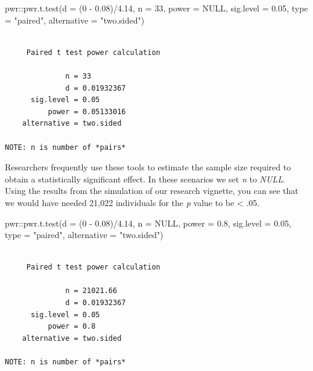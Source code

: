 \documentclass[
  11pt,
]{book}
\newenvironment{Shaded}{\begin{snugshade}}{\end{snugshade}}
\newcommand{\AttributeTok}[1]{\textcolor[rgb]{0.77,0.63,0.00}{#1}}
\newcommand{\ConstantTok}[1]{\textcolor[rgb]{0.00,0.00,0.00}{#1}}
\newcommand{\DecValTok}[1]{\textcolor[rgb]{0.00,0.00,0.81}{#1}}
\newcommand{\FloatTok}[1]{\textcolor[rgb]{0.00,0.00,0.81}{#1}}
\newcommand{\FunctionTok}[1]{\textcolor[rgb]{0.00,0.00,0.00}{#1}}
\newcommand{\NormalTok}[1]{#1}
\newcommand{\SpecialCharTok}[1]{\textcolor[rgb]{0.00,0.00,0.00}{#1}}
\newcommand{\StringTok}[1]{\textcolor[rgb]{0.31,0.60,0.02}{#1}}
\begin{document}
\begin{Shaded}
\begin{Highlighting}[]
\NormalTok{pwr}\SpecialCharTok{::}\FunctionTok{pwr.t.test}\NormalTok{(}\AttributeTok{d =}\NormalTok{ (}\DecValTok{0} \SpecialCharTok{{-}} \FloatTok{0.08}\NormalTok{)}\SpecialCharTok{/}\FloatTok{4.14}\NormalTok{, }\AttributeTok{n =} \DecValTok{33}\NormalTok{, }\AttributeTok{power =} \ConstantTok{NULL}\NormalTok{, }\AttributeTok{sig.level =} \FloatTok{0.05}\NormalTok{,}
    \AttributeTok{type =} \StringTok{"paired"}\NormalTok{, }\AttributeTok{alternative =} \StringTok{"two.sided"}\NormalTok{)}
\end{Highlighting}
\end{Shaded}

\begin{verbatim}

     Paired t test power calculation 

              n = 33
              d = 0.01932367
      sig.level = 0.05
          power = 0.05133016
    alternative = two.sided

NOTE: n is number of *pairs*
\end{verbatim}

Researchers frequently use these tools to estimate the sample size required to obtain a statistically significant effect. In these scenarios we set \emph{n} to \emph{NULL}. Using the results from the simulation of our research vignette, you can see that we would have needed 21,022 individuals for the \emph{p} value to be \textless{} .05.

\begin{Shaded}
\begin{Highlighting}[]
\NormalTok{pwr}\SpecialCharTok{::}\FunctionTok{pwr.t.test}\NormalTok{(}\AttributeTok{d =}\NormalTok{ (}\DecValTok{0} \SpecialCharTok{{-}} \FloatTok{0.08}\NormalTok{)}\SpecialCharTok{/}\FloatTok{4.14}\NormalTok{, }\AttributeTok{n =} \ConstantTok{NULL}\NormalTok{, }\AttributeTok{power =} \FloatTok{0.8}\NormalTok{, }\AttributeTok{sig.level =} \FloatTok{0.05}\NormalTok{,}
    \AttributeTok{type =} \StringTok{"paired"}\NormalTok{, }\AttributeTok{alternative =} \StringTok{"two.sided"}\NormalTok{)}
\end{Highlighting}
\end{Shaded}

\begin{verbatim}

     Paired t test power calculation 

              n = 21021.66
              d = 0.01932367
      sig.level = 0.05
          power = 0.8
    alternative = two.sided

NOTE: n is number of *pairs*
\end{verbatim}
\end{document}
